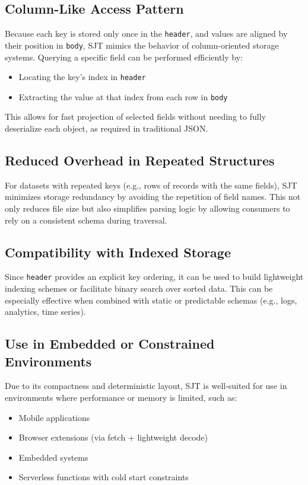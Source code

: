 \documentclass[12pt]{article}
\begin{document}
\subsection{Column-Like Access Pattern}
Because each key is stored only once in the \texttt{header}, and values are aligned by their position in \texttt{body}, SJT mimics the behavior of column-oriented storage systems. Querying a specific field can be performed efficiently by:

\begin{itemize}
  \item Locating the key's index in \texttt{header}
  \item Extracting the value at that index from each row in \texttt{body}
\end{itemize}

This allows for fast projection of selected fields without needing to fully deserialize each object, as required in traditional JSON.

\subsection{Reduced Overhead in Repeated Structures}
For datasets with repeated keys (e.g., rows of records with the same fields), SJT minimizes storage redundancy by avoiding the repetition of field names. This not only reduces file size but also simplifies parsing logic by allowing consumers to rely on a consistent schema during traversal.

\subsection{Compatibility with Indexed Storage}
Since \texttt{header} provides an explicit key ordering, it can be used to build lightweight indexing schemes or facilitate binary search over sorted data. This can be especially effective when combined with static or predictable schemas (e.g., logs, analytics, time series).

\subsection{Use in Embedded or Constrained Environments}
Due to its compactness and deterministic layout, SJT is well-suited for use in environments where performance or memory is limited, such as:

\begin{itemize}
  \item Mobile applications
  \item Browser extensions (via fetch + lightweight decode)
  \item Embedded systems
  \item Serverless functions with cold start constraints
\end{itemize}
\end{document}

